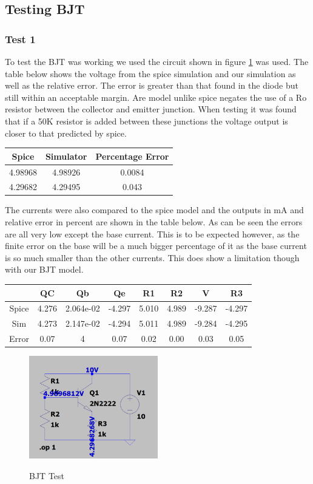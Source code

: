 \documentclass{article}
\begin{document}
\subsection{Testing BJT}
\subsubsection{Test 1}
To test the BJT was working we used the circuit shown in figure \ref{fig:BJTTest1} was used. The table below shows the voltage from the spice simulation and our simulation as well as the relative error. The error is greater than that found in the diode but still within an acceptable margin. Are model unlike spice negates the use of a Ro resistor between the collector and emitter junction. When testing it was found that if a 50K resistor is added between these junctions the voltage output is closer to that predicted by spice. 
\begin{center}
\begin{tabular}{ ||c| c ||c ||}
\hline
 Spice & Simulator & Percentage Error \\ 
 \hline
 4.98968 & 4.98926 & 0.0084 \\  
 4.29682 & 4.29495 & 0.043 \\   
 \hline
\end{tabular}
\end{center}
The currents were also compared to the spice model and the outputs in mA and relative error in percent are shown in the table below. As can be seen the errors are all very low except the base current. This is to be expected however, as the finite error on the base will be a much bigger percentage of it as the base current is so much smaller than the other currents. This does show a limitation though with our BJT model. 
\begin{center}
\begin{tabular}{ ||c| c |c |c | c| c| c| c ||}
\hline
  & QC & Qb & Qe & R1 & R2 & V & R3 \\ 
  \hline
 Spice & 4.276 & 2.064e-02 & -4.297 & 5.010 & 4.989 & -9.287 & -4.297\\
 Sim & 4.273& 2.147e-02& -4.294& 5.011& 4.989& -9.284& -4.295  \\
 Error &  0.07& 4 & 0.07 & 0.02 & 0.00 & 0.03 & 0.05  \\   
 \hline
\end{tabular}
\end{center}
\begin{figure}[h]
    \caption{BJT Test}
    \centering
    \includegraphics[width=0.5\textwidth]{images/BJTTest1.png}
    \label{fig:BJTTest1}
\end{figure}
\newpage
\end{document}
